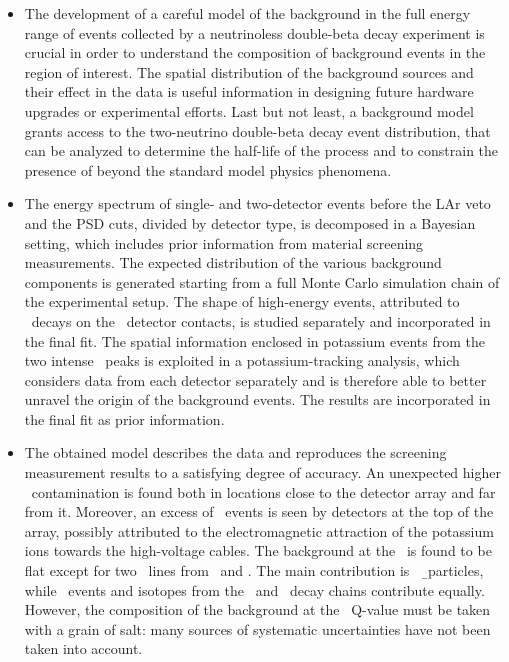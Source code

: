 \chapsummary
\begin{itemize}
  \item The development of a careful model of the background in the full energy range of
    events collected by a neutrinoless double-beta decay experiment is crucial in order to
    understand the composition of background events in the region of interest. The spatial
    distribution of the background sources and their effect in the data is useful
    information in designing future hardware upgrades or experimental efforts. Last but
    not least, a background model grants access to the two-neutrino double-beta decay
    event distribution, that can be analyzed to determine the half-life of the process and
    to constrain the presence of beyond the standard model physics phenomena.
  \item The energy spectrum of single- and two-detector events before the LAr veto and the
    PSD cuts, divided by detector type, is decomposed in a Bayesian setting, which
    includes prior information from material screening measurements. The expected
    distribution of the various background components is generated starting from a full
    Monte Carlo simulation chain of the experimental setup. The shape of high-energy events,
    attributed to \a\ decays on the \pplus\ detector contacts, is studied separately and
    incorporated in the final fit. The spatial information enclosed in potassium events
    from the two intense \g\ peaks is exploited in a potassium-tracking analysis, which
    considers data from each detector separately and is therefore able to better
    unravel the origin of the background events. The results are incorporated in the final
    fit as prior information.
  \item The obtained model describes the data and reproduces the screening measurement
    results to a satisfying degree of accuracy. An unexpected higher \kvn\ contamination
    is found both in locations close to the detector array and far from it. Moreover, an
    excess of \kvz\ events is seen by detectors at the top of the array, possibly
    attributed to the electromagnetic attraction of the potassium ions towards the
    high-voltage cables. The background at the \onbb\ is found to be flat except for two
    \g\ lines from \Tl\ and \Bih. The main contribution is \kvz\ \b\ particles, while \a\
    events and isotopes from the \Thh\ and \Uh\ decay chains contribute equally. However,
    the composition of the background at the \onbb\ Q-value must be taken with a grain of
    salt: many sources of systematic uncertainties have not been taken into account.

\end{itemize}
